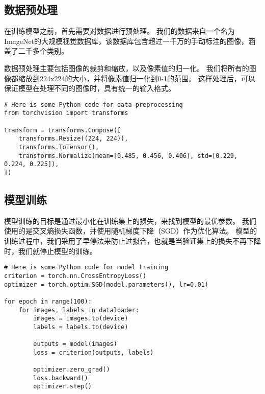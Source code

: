 \subsection{数据预处理}\label{subsec:data-preprocessing}
在训练模型之前，首先需要对数据进行预处理。
我们的数据来自一个名为ImageNet的大规模视觉数据库，该数据库包含超过一千万的手动标注的图像，涵盖了二千多个类别。\par
数据预处理主要包括图像的裁剪和缩放，以及像素值的归一化。
我们将所有的图像都缩放到224x224的大小，并将像素值归一化到0-1的范围。
这样处理后，可以保证模型在处理不同的图像时，具有统一的输入格式。\par
\begin{verbatim}
# Here is some Python code for data preprocessing
from torchvision import transforms

transform = transforms.Compose([
    transforms.Resize((224, 224)),
    transforms.ToTensor(),
    transforms.Normalize(mean=[0.485, 0.456, 0.406], std=[0.229, 0.224, 0.225]),
])
\end{verbatim}

\subsection{模型训练}\label{subsec:model-training}
模型训练的目标是通过最小化在训练集上的损失，来找到模型的最优参数。
我们使用的是交叉熵损失函数，并使用随机梯度下降（SGD）作为优化算法。
模型的训练过程中，我们采用了早停法来防止过拟合，也就是当验证集上的损失不再下降时，我们就停止模型的训练。\par
\begin{verbatim}
# Here is some Python code for model training
criterion = torch.nn.CrossEntropyLoss()
optimizer = torch.optim.SGD(model.parameters(), lr=0.01)

for epoch in range(100):
    for images, labels in dataloader:
        images = images.to(device)
        labels = labels.to(device)

        outputs = model(images)
        loss = criterion(outputs, labels)

        optimizer.zero_grad()
        loss.backward()
        optimizer.step()
\end{verbatim}

